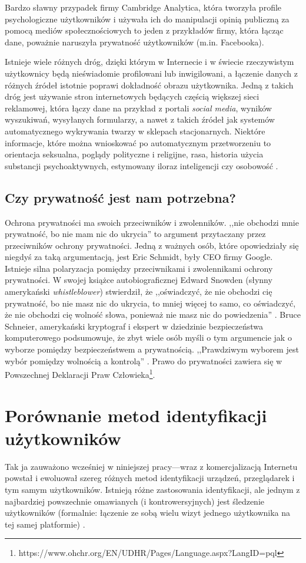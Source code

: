 Bardzo sławny przypadek firmy Cambridge Analytica, która tworzyła profile
psychologiczne użytkowników i używała ich do manipulacji opinią publiczną za
pomocą mediów społecznościowych to jeden z przykładów firmy, która łącząc dane,
poważnie naruszyła prywatność użytkowników (m.in. Facebooka).

Istnieje wiele różnych dróg, dzięki którym w Internecie i w świecie rzeczywistym
użytkownicy będą nieświadomie profilowani lub inwigilowani, a łączenie danych z
różnych źródeł istotnie poprawi dokładność obrazu użytkownika. Jedną z takich
dróg jest używanie stron internetowych będących częścią większej sieci
reklamowej, która łączy dane na przykład z portali \emph{social media}, wyników
wyszukiwań, wysyłanych formularzy, a nawet z takich źródeł jak systemów
automatycznego wykrywania twarzy w sklepach stacjonarnych. Niektóre informacje,
które można wnioskować po automatycznym przetworzeniu to orientacja seksualna,
poglądy polityczne i religijne, rasa, historia użycia substancji
psychoaktywnych, estymowany iloraz inteligencji czy osobowość
\cite{kosinski2013private}.

\subsection{Czy prywatność jest nam potrzebna?}
Ochrona prywatności ma swoich przeciwników i zwolenników. ,,nie obchodzi mnie
prywatność, bo nie mam nic do ukrycia'' to argument przytaczany przez
przeciwników ochrony prywatności. Jedną z ważnych osób, które opowiedziały się
niegdyś za taką argumentacją, jest Eric Schmidt, były CEO firmy Google. Istnieje
silna polaryzacja pomiędzy przeciwnikami i zwolennikami ochrony prywatności. W
swojej książce autobiograficznej Edward Snowden (słynny amerykański
\emph{whistleblower}) stwierdził, że ,,oświadczyć, że nie obchodzi cię
prywatność, bo nie masz nic do ukrycia, to mniej więcej to samo, co oświadczyć,
że nie obchodzi cię wolność słowa, ponieważ nie masz nic do powiedzenia''
\cite{snowden2019pamiec}. Bruce Schneier, amerykański kryptograf i ekspert w
dziedzinie bezpieczeństwa komputerowego podsumowuje, że zbyt wiele osób myśli o
tym argumencie jak o wyborze pomiędzy bezpieczeństwem a prywatnością.
,,Prawdziwym wyborem jest wybór pomiędzy wolnością a kontrolą''
\cite{schneier2006eternal}. Prawo do prywatności zawiera się w Powszechnej
Deklaracji Praw
Człowieka\footnote{https://www.ohchr.org/EN/UDHR/Pages/Language.aspx?LangID=pql}.

\section{Porównanie metod identyfikacji użytkowników}
Tak ja zauważono wcześniej w niniejszej pracy---wraz z komercjalizacją Internetu
powstał i ewoluował szereg różnych metod identyfikacji urządzeń, przeglądarek i
tym samym użytkowników. Istnieją różne zastosowania identyfikacji, ale jednym z
najbardziej powszechnie omawianych (i kontrowersyjnych) jest śledzenie
użytkowników (formalnie: łączenie ze sobą wielu wizyt jednego użytkownika na tej
samej platformie) \cite[s. 3]{al2020too}.

